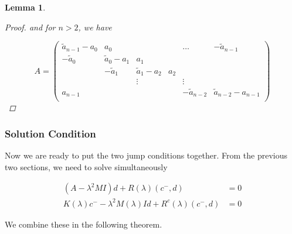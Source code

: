 \documentclass[12pt]{article}
\newtheorem{lemma}{Lemma}
\begin{document}
\begin{lemma}
\begin{proof}
and for $n > 2$, we have

\[
A = 
\begin{pmatrix}
\tilde{a}_{n-1} - a_0 & a_0 & & & \dots & -\tilde{a}_{n-1}\\
-\tilde{a}_0 & \tilde{a}_0 - a_1 &  a_1 \\
& -\tilde{a}_1 & \tilde{a}_1 - a_2 &  a_2 \\
& & \vdots & & \vdots \\
a_{n-1} & & & & -\tilde{a}_{n-2} & \tilde{a}_{n-2} - a_{n-1} \\
\end{pmatrix}
\]

\end{proof}
\end{lemma}

\subsubsection{Solution Condition}

Now we are ready to put the two jump conditions together. From the previous two sections, we need to solve simultaneously

\begin{align*}
(A - \lambda^2 MI)d + R(\lambda)(c^-,d) &= 0 \\
K(\lambda)c^- -\lambda^2 M(\lambda) I d + R^c(\lambda)(c^-,d) &= 0
\end{align*}

We combine these in the following theorem.
\end{document}
